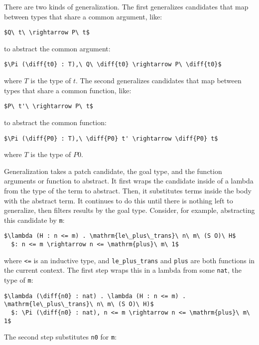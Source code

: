 There are two kinds of generalization.
The first generalizes candidates that map between types that share a common argument, like: %

\begin{lstlisting}[language=coq]
  $Q\ t\ \rightarrow P\ t$
\end{lstlisting}
to abstract the common argument:

\begin{lstlisting}[language=coq]
  $\Pi (\diff{t0} : T),\ Q\ \diff{t0} \rightarrow P\ \diff{t0}$
\end{lstlisting}
where $T$ is the type of $t$.
The second generalizes candidates that map between types that share a common function, like:

\begin{lstlisting}[language=coq]
  $P\ t'\ \rightarrow P\ t$
\end{lstlisting}
to abstract the common function:

\begin{lstlisting}[language=coq]
  $\Pi (\diff{P0} : T),\ \diff{P0} t' \rightarrow \diff{P0} t$
\end{lstlisting} 
where $T$ is the type of $P0$.

Generalization takes a patch candidate, the goal type, and the function arguments or function to abstract.
It first wraps the candidate inside of a lambda from the type of the term to abstract.
Then, it substitutes terms inside the body with the abstract term.
It continues to do this until there is nothing left to generalize, then filters results by the goal type.
Consider, for example, abstracting this candidate by \lstinline{m}: %

\begin{lstlisting}[language=coq]
  $\lambda (H : n <= m) . \mathrm{le\_plus\_trans}\ n\ m\ (S O)\ H$
  $: n <= m \rightarrow n <= \mathrm{plus}\ m\ 1$
\end{lstlisting}
where \lstinline{<=} is an inductive type, and \lstinline{le_plus_trans} and \lstinline{plus} are both functions in the current context.
The first step wraps this in a lambda from some \lstinline{nat}, the type of \lstinline{m}:

\begin{lstlisting}[language=coq]
  $\lambda (\diff{n0} : nat) . \lambda (H : n <= m) . \mathrm{le\_plus\_trans}\ n\ m\ (S O)\ H)$
  $: \Pi (\diff{n0} : nat), n <= m \rightarrow n <= \mathrm{plus}\ m\ 1$
\end{lstlisting}
The second step substitutes \lstinline{n0} for \lstinline{m}:

